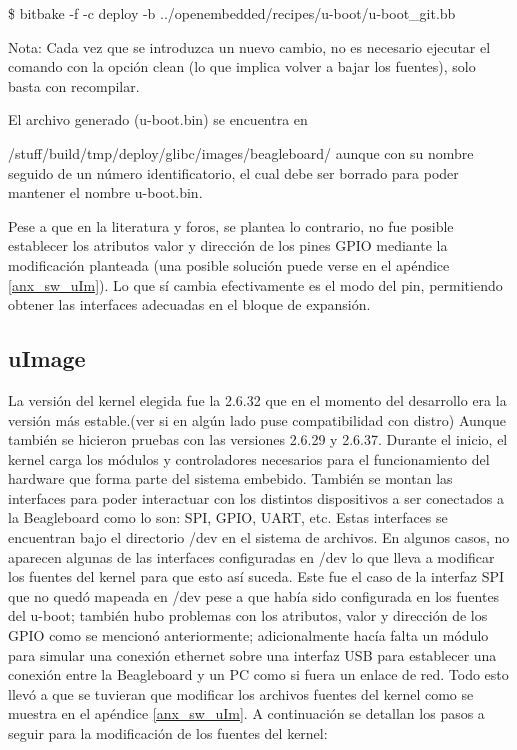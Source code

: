 \centerline{\$ bitbake -f -c deploy -b ../openembedded/recipes/u-boot/u-boot\_git.bb}

\bigskip
Nota: Cada vez que se introduzca un nuevo cambio, no es necesario ejecutar el comando con la opción clean (lo que implica volver a bajar los fuentes), solo basta con recompilar.

\bigskip
El archivo generado (u-boot.bin) se encuentra en 

/stuff/build/tmp/deploy/glibc/images/beagleboard/ aunque con su nombre seguido de un número identificatorio, el cual debe ser borrado para poder mantener el nombre u-boot.bin.

\bigskip
Pese a que en la literatura y foros, se plantea lo contrario, no fue posible establecer los atributos valor y dirección de los pines GPIO mediante la modificación planteada (una posible solución puede verse en el apéndice \ref{anx_sw_uIm}). Lo que sí cambia efectivamente es el modo del pin, permitiendo obtener las interfaces adecuadas en el bloque de expansión.

\subsection{uImage}
La versión del kernel elegida fue la 2.6.32 que en el momento del desarrollo era la versión más estable.(ver si en algún lado puse compatibilidad con distro) Aunque también se hicieron pruebas con las versiones 2.6.29 y 2.6.37.
Durante el inicio, el kernel carga los módulos y controladores necesarios para el funcionamiento del 
hardware que forma parte del sistema embebido. También se montan las interfaces para poder interactuar con los distintos dispositivos a ser conectados a la Beagleboard como lo son: SPI, GPIO, UART, etc. Estas interfaces se encuentran bajo el directorio /dev en el sistema de archivos. En algunos casos, no aparecen algunas de las interfaces configuradas en /dev lo que lleva a modificar los fuentes del kernel para que esto así suceda. Este fue el caso de la interfaz SPI que no quedó mapeada en /dev pese a que había sido configurada en los fuentes del u-boot; también hubo problemas con los atributos, valor y dirección de los GPIO como se mencionó anteriormente; adicionalmente hacía falta un módulo para simular una conexión ethernet sobre una interfaz USB para establecer una conexión entre la Beagleboard y un PC como si fuera un enlace de red. 
Todo esto llevó a que se tuvieran que modificar los archivos fuentes del kernel como se muestra en el apéndice \ref{anx_sw_uIm}.
A continuación se detallan los pasos a seguir para la modificación de los fuentes del kernel:
 
